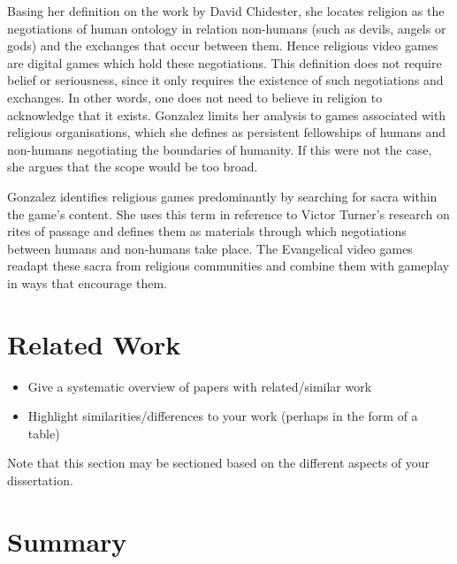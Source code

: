 Basing her definition on the work by David Chidester, she locates religion as the negotiations of human ontology in relation non-humans (such as devils, angels or gods) and the exchanges that occur between them. Hence religious video games are digital games which hold these negotiations. This definition does not require belief or seriousness, since it only requires the existence of such negotiations and exchanges. In other words, one does not need to believe in religion to acknowledge that it exists. Gonzalez limits her analysis to games associated with religious organisations, which she defines as persistent fellowships of humans and non-humans negotiating the boundaries of humanity. If this were not the case, she argues that the scope would be too broad.
 
Gonzalez identifies religious games predominantly by searching for sacra within the game’s content. She uses this term in reference to Victor Turner’s research on rites of passage and defines them as materials through which negotiations between humans and non-humans take place. The Evangelical video games readapt these sacra from religious communities and combine them with gameplay in ways that encourage them.


\section{Related Work}

  \begin{itemize}
   \item Give a systematic overview of papers with related/similar work
   \item Highlight similarities/differences to your work (perhaps in the form of a table)
  \end{itemize}

  Note that this section may be sectioned based on the different aspects of your dissertation.
\fi

\section{Summary}
\blindtext
